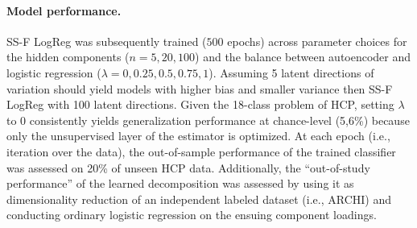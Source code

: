 \documentclass{article} %
\begin{document}
\begin{table}[h]
 \centering
 \vspace{-0.2cm}
 \caption{\textbf{Serial versus parallel dimensionality reduction and classification.}
 Chance is at 5,6\%.
 }
 \label{table_one}
 \end{table}
\paragraph{Model performance.}
SS-F LogReg was subsequently trained ($500$ epochs) across parameter choices
for the hidden components ($n=5, 20, 100$) and
the balance between autoencoder and logistic regression
($\lambda=0, 0.25, 0.5, 0.75, 1$).
Assuming 5 latent directions of variation should yield models with
higher bias and smaller variance then SS-F LogReg with 100 latent directions.
%
Given the 18-class problem of HCP, setting $\lambda$ to $0$
consistently yields generalization performance
at chance-level (5,6\%) because
only the unsupervised layer of the estimator is optimized.
%
At each epoch (i.e., iteration over the data),
the out-of-sample performance of the trained classifier
was assessed on 20\% of unseen HCP data.
Additionally, the ``out-of-study performance'' of the learned decomposition
was assessed by using it as dimensionality reduction of an
independent labeled dataset (i.e., ARCHI) and conducting ordinary
logistic regression on the ensuing component loadings.
\end{document}
